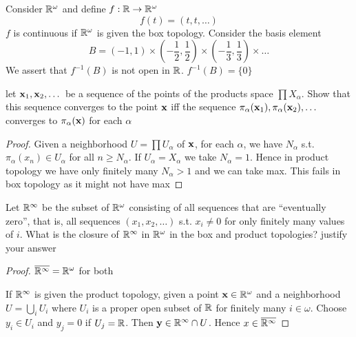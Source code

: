 \documentclass[11pt]{article}
\begin{document}
\begin{examplle}[]
Consider \(\mathbb{R}^\omega\) and define \(f:\mathbb{R}\to\mathbb{R}^\omega\)
\begin{equation*}
f(t)=(t,t,\dots)
\end{equation*}
\(f\) is continuous if \(\mathbb{R}^\omega\) is given the box topology. Consider the basis element
\begin{equation*}
B=(-1,1)\times(-\frac{1}{2},\frac{1}{2})\times(-\frac{1}{3},\frac{1}{3})\times\dots
\end{equation*}
We assert that \(f^{-1}(B)\) is not open in \(\mathbb{R}\). \(f^{-1}(B)=\{0\}\)
\end{examplle}

\begin{exercise}
\label{ex19.6}
let \(\operatorname{\textbf{x}}_1,\operatorname{\textbf{x}}_2,\dots\) be a sequence of the points of the products space \(\prod X_\alpha\). Show that this
sequence converges to the point \(\operatorname{\textbf{x}}\) iff the sequence \(\pi_\alpha(\operatorname{\textbf{x}}_1),\pi_\alpha(\operatorname{\textbf{x}}_2),\dots\) converges
to \(\pi_\alpha(\operatorname{\textbf{x}})\) for each \(\alpha\)
\end{exercise}

\begin{proof}
Given a neighborhood \(U=\prod U_\alpha\) of \(\operatorname{\textbf{x}}\), for each \(\alpha\), we have \(N_\alpha\) s.t. \(\pi_\alpha(x_n)\in U_\alpha\) for
all \(n\ge N_\alpha\). If \(U_\alpha=X_\alpha\) we take \(N_\alpha=1\). Hence in product topology we have only finitely
many \(N_\alpha>1\) and we can take max. This fails in box topology as it might not have max
\end{proof}

\begin{exercise}
\label{ex19.7}
Let \(\mathbb{R}^\infty\) be the subset of \(\mathbb{R}^\omega\) consisting of all sequences that are ``eventually zero'', that
is, all sequences \((x_1,x_2,\dots)\) s.t. \(x_i\neq0\) for only finitely many values of \(i\). What is
the closure of \(\mathbb{R}^\infty\) in \(\mathbb{R}^\omega\) in the box and product topologies? justify your answer
\end{exercise}

\begin{proof}
\(\overline{\mathbb{R}^\infty}=\mathbb{R}^\omega\) for both

If \(\mathbb{R}^\infty\) is given the product topology, given a point \(\operatorname{\textbf{x}}\in\mathbb{R}^\omega\) and a neighborhood \(U=\bigcup_i U_i\)
where \(U_i\) is a proper open subset of \(\mathbb{R}\) for finitely many \(i\in\omega\). Choose \(y_i\in U_i\)
and \(y_j=0\) if \(U_j=\mathbb{R}\). Then \(\operatorname{\textbf{y}}\in\mathbb{R}^\infty\cap U\). Hence \(x\in\overline{\mathbb{R}^\infty}\)
\end{proof}
\end{document}
